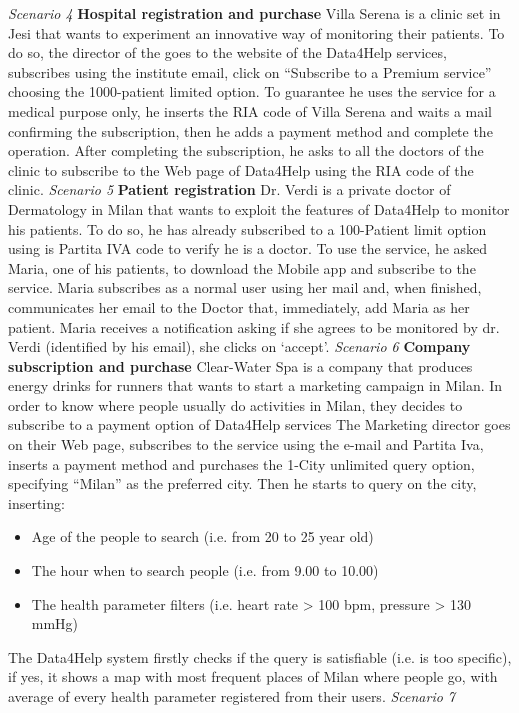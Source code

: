 \vspace{2mm} \newline
\noindent \emph{Scenario 4} \textbf{Hospital registration and purchase } \newline
Villa Serena is a clinic set in Jesi that wants to experiment an innovative way of monitoring their patients. To do so, the director of the goes to the website of the Data4Help services, subscribes using the institute email, click on “Subscribe to a Premium service” choosing the 1000-patient limited option. To guarantee he uses the service for a medical purpose only, he inserts the RIA code of Villa Serena and waits a mail confirming the subscription, then he adds a payment method and complete the operation.
After completing the subscription, he asks to all the doctors of the clinic to subscribe to the Web page of Data4Help using the RIA code of the clinic.
\vspace{2mm} \newline
\noindent \emph{Scenario 5} \textbf{Patient registration} \newline
Dr. Verdi is a private doctor of Dermatology in Milan that wants to exploit the features of Data4Help to monitor his patients. To do so, he has already subscribed to a 100-Patient limit option using is Partita IVA code to verify he is a doctor. To use the service, he asked Maria, one of his patients, to download the Mobile app and subscribe to the service.
Maria subscribes as a normal user using her mail and, when finished, communicates her email to the Doctor that, immediately, add Maria as her patient. Maria receives a notification asking if she agrees to be monitored by dr. Verdi (identified by his email), she clicks on ‘accept’.
\vspace{2mm}\newline
\noindent \emph{Scenario 6} \textbf{Company subscription and purchase} \newline
Clear-Water Spa is a company that produces energy drinks for runners that wants to start a marketing campaign in Milan. In order to know where people usually do activities in Milan, they decides to subscribe to a payment option of Data4Help services The Marketing director goes on their Web page, subscribes to the service using the e-mail and Partita Iva, inserts a payment method and purchases the 1-City unlimited query option, specifying “Milan” as the preferred city.
Then he starts to query on the city, inserting:
\begin{itemize}
    \item Age of the people to search (i.e. from 20 to 25 year old)
    \item The hour when to search people (i.e. from 9.00 to 10.00)
    \item The health parameter filters (i.e. heart rate > 100 bpm, pressure > 130 mmHg)
\end{itemize}
 The Data4Help system firstly checks if the query is satisfiable (i.e. is too specific), if yes, it shows a map with most frequent places of Milan where people go, with average of every health parameter registered from their users.
\vspace{2mm} \newline
\noindent \emph{Scenario 7} 